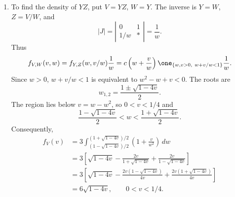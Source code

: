 \documentclass[a4paper]{article}
\begin{document}
\begin{enumerate}
The conditional expectation $\E[Z|Y]$ is the random variable $g(Y)$, where $g(y)=\E[Z|Y=y]$ is obtained as in the first case.
\item To find the density of $YZ$, put $V=YZ$, $W=Y$. The inverse is $Y=W$, $Z=V/W$, and
\[
|J|=\left|\begin{matrix}0&1\\1/w&*\end{matrix}\right|=\frac1w.
\]
Thus
\[
f_{V,W}(v,w)=f_{Y,Z}(w,v/w)\frac1w
=c\left(w+\frac vw\right)\one_{\{w,v>0,\ w+v/w<1\}}\frac1w.
\]
Since $w>0$, $w+v/w<1$ is equivalent to $w^2-w+v<0$. The roots are
\[
w_{1,2}=\frac{1\pm\sqrt{1-4v}}2.
\]
The region lies below $v=w-w^2$, so $0<v<1/4$ and
\[
\frac{1-\sqrt{1-4v}}2<w<\frac{1+\sqrt{1-4v}}2.
\]
Consequently,
\begin{align*}
f_V(v)&=3\int_{(1-\sqrt{1-4v})/2}^{(1+\sqrt{1-4v})/2}
\left(1+\frac v{w^2}\right)\,dw\\
&=3\left[\sqrt{1-4v}
-\frac{2v}{1+\sqrt{1-4v}}+\frac{2v}{1-\sqrt{1-4v}}\right]\\
&=3\left[\sqrt{1-4v}
-\frac{2v(1-\sqrt{1-4v})}{4v}
+\frac{2v(1+\sqrt{1-4v})}{4v}\right]\\
&=6\sqrt{1-4v},\qquad 0<v<1/4.
\end{align*}
\end{enumerate}
\begin{center}
\end{center}
\end{document}
